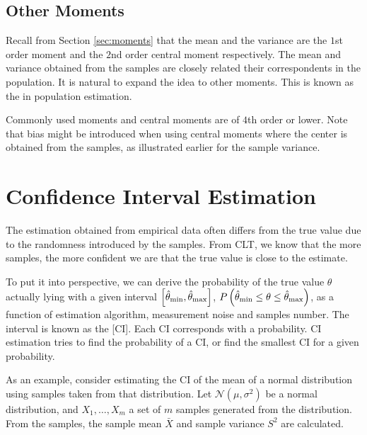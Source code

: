 \subsection{Other Moments}

Recall from Section \ref{sec:moments} that the mean and the variance are the $1$st order moment and the $2$nd order central moment respectively. The mean and variance obtained from the samples are closely related their correspondents in the population. It is natural to expand the idea to other moments. This is known as the  in population estimation.

Commonly used moments and central moments are of $4$th order or lower. Note that bias might be introduced when using central moments where the center is obtained from the samples, as illustrated earlier for the sample variance.

\section{Confidence Interval Estimation}

The estimation obtained from empirical data often differs from the true value due to the randomness introduced by the samples. From CLT, we know that the more samples, the more confident we are that the true value is close to the estimate. 

To put it into perspective, we can derive the probability of the true value $\theta$ actually lying with a given interval $\left[\hat{\theta}_{\textup{min}},\hat{\theta}_{\textup{max}}\right]$, $P\left(\hat{\theta}_{\textup{min}} \leq \theta \leq \hat{\theta}_{\textup{max}}\right)$, as a function of estimation algorithm, measurement noise and samples number. The interval is known as the [CI]. Each CI corresponds with a probability. CI estimation tries to find the probability of a CI, or find the smallest CI for a given probability.

As an example, consider estimating the CI of the mean of a normal distribution using samples taken from that distribution. Let $\mathcal{N}(\mu,\sigma^2)$ be a normal distribution, and $X_1, \ldots, X_m$ a set of $m$ samples generated from the distribution. From the samples, the sample mean $\bar{X}$ and sample variance $S^2$ are calculated.

